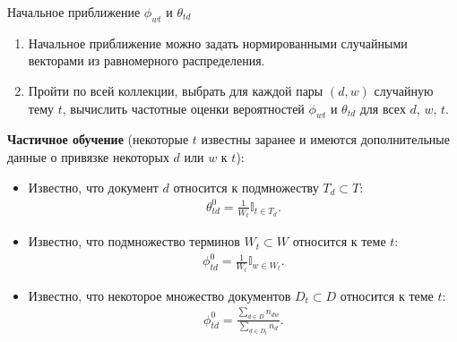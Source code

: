 \documentclass[unicode,9pt, pdf]{beamer}
\begin{document}
\begin{frame}{Начальное приближение $\phi_{w t}$ и $\theta_{t d}$}
\begin{enumerate}
    \item Начальное приближение можно задать нормированными случайными векторами из равномерного распределения. 
    \item Пройти по всей коллекции, выбрать для каждой пары $(d, w)$ случайную тему $t$, вычислить частотные оценки вероятностей $\phi_{w t}$ и $\theta_{t d}$ для всех $d$, $w$, $t$.
\end{enumerate}

\textbf{Частичное обучение} (некоторые $t$ известны заранее и имеются дополнительные данные о привязке некоторых $d$ или $w$ к $t$):
    \begin{itemize}
        \item Известно, что документ $d$ относится к подмножеству $T_d \subset T$:
        \begin{gather*}
            \theta_{t d}^0 = \frac{1}{W_t} \mathbb{I}_{t \in T_d}.
        \end{gather*}
        \item Известно, что подмножество терминов $W_t \subset W$ относится к теме $t$:
        \begin{gather*}
            \phi_{t d}^0 = \frac{1}{W_t} \mathbb{I}_{w \in W_t}.
        \end{gather*}
        \item Известно, что некоторое множество документов $D_t \subset D$ относится к теме $t$:
        \begin{gather*}
        \phi_{t d}^0 = \frac{\sum_{d \in D} n_{d w}}{\sum_{d \in D_t} n_d}.
        \end{gather*}
    \end{itemize}
\end{frame}
\end{document}
